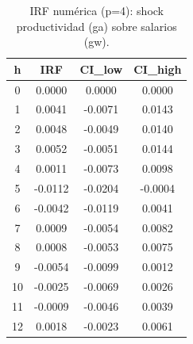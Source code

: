 \begin{table}[htbp]
\centering
\caption{IRF numérica (p=4): shock productividad (ga) sobre salarios (gw).}
\label{tab_irf_ga_gw_p4}
\footnotesize
\begin{tabular}{cccc}
\toprule
h & IRF & CI_low & CI_high \\
\midrule
 0 & 0.0000 & 0.0000 & 0.0000 \\
 1 & 0.0041 & -0.0071 & 0.0143 \\
 2 & 0.0048 & -0.0049 & 0.0140 \\
 3 & 0.0052 & -0.0051 & 0.0144 \\
 4 & 0.0011 & -0.0073 & 0.0098 \\
 5 & -0.0112 & -0.0204 & -0.0004 \\
 6 & -0.0042 & -0.0119 & 0.0041 \\
 7 & 0.0009 & -0.0054 & 0.0082 \\
 8 & 0.0008 & -0.0053 & 0.0075 \\
 9 & -0.0054 & -0.0099 & 0.0012 \\
10 & -0.0025 & -0.0069 & 0.0026 \\
11 & -0.0009 & -0.0046 & 0.0039 \\
12 & 0.0018 & -0.0023 & 0.0061 \\
\bottomrule
\end{tabular}
\end{table}

